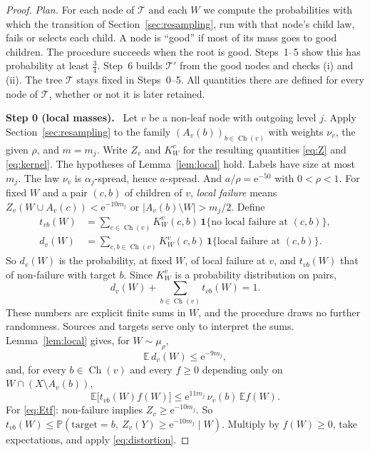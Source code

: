 \documentclass[11pt]{article}
\numberwithin{equation}{section}
\newcommand{\PP}{\mathbb P}
\newcommand{\EE}{\mathbb E}
\newcommand{\ind}{\mathbf 1}
\newcommand{\TT}{\mathcal T}
\newcommand{\ch}{\operatorname{Ch}}
\newcommand{\ee}{\mathrm e}
\newcommand{\step}[2]{\medskip\noindent\textbf{Step #1 (#2).}\ }
\begin{document}
\begin{proof}
\emph{Plan.} For each node of $\TT$ and each $W$ we compute the
probabilities with which the transition of
Section~\ref{sec:resampling}, run with that node's child law, fails or
selects each child. A node is ``good'' if most of its mass goes to
good children. The procedure succeeds when the root is good.
Steps~1--5 show this has probability at least $\frac34$. Step~6 builds
$\TT'$ from the good nodes and checks (i) and (ii). The tree $\TT$
stays fixed in Steps~0--5. All quantities there are defined for every
node of $\TT$, whether or not it is later retained.

\step{0}{local masses}
Let $v$ be a non-leaf node with outgoing level $j$. Apply
Section~\ref{sec:resampling} to the family $(A_v(b))_{b\in\ch(v)}$
with weights $\nu_v$, the given $\rho$, and $m=m_j$. Write $Z_v$ and
$K^v_W$ for the resulting quantities \eqref{eq:Z} and
\eqref{eq:kernel}. The hypotheses of Lemma~\ref{lem:local} hold.
Labels have size at most $m_j$. The law $\nu_v$ is $\alpha_j$-spread,
hence $a$-spread. And $a/\rho=\ee^{-50}$ with $0<\rho<1$. For fixed
$W$ and a pair $(c,b)$ of children of $v$, \emph{local failure} means
$Z_v(W\cup A_v(c))<\ee^{-10m_j}$ or $|A_v(b)\setminus W|>m_j/2$.
Define
\begin{align}
 t_{vb}(W)&=\sum_{c\in\ch(v)}K^v_W(c,b)\,
            \ind\{\text{no local failure at }(c,b)\},\label{eq:t-def}\\
 d_v(W)&=\sum_{c,b\in\ch(v)}K^v_W(c,b)\,
            \ind\{\text{local failure at }(c,b)\}.\label{eq:d-def}
\end{align}
So $d_v(W)$ is the probability, at fixed $W$, of local failure at $v$,
and $t_{vb}(W)$ that of non-failure with target $b$. Since $K_W^v$ is
a probability distribution on pairs,
\begin{equation}\label{eq:local-masses}
 d_v(W)+\sum_{b\in\ch(v)}t_{vb}(W)=1.
\end{equation}
These numbers are explicit finite sums in $W$, and the procedure draws
no further randomness. Sources and targets serve only to interpret the
sums. Lemma~\ref{lem:local} gives, for $W\sim\mu_\rho$,
\begin{equation}\label{eq:Ed}
 \EE\,d_v(W)\le\ee^{-9m_j},
\end{equation}
and, for every $b\in\ch(v)$ and every $f\ge0$ depending only on
$W\cap(X\setminus A_v(b))$,
\begin{equation}\label{eq:Etf}
 \EE\bigl[t_{vb}(W)f(W)\bigr]\le\ee^{11m_j}\,\nu_v(b)\,\EE f(W).
\end{equation}
For \eqref{eq:Etf}: non-failure implies $Z_v\ge\ee^{-10m_j}$. So
$t_{vb}(W)\le\PP(\mathrm{target}=b,\ Z_v(Y)\ge\ee^{-10m_j}\mid W)$.
Multiply by $f(W)\ge0$, take expectations, and apply
\eqref{eq:distortion}.


\end{proof}
\end{document}
